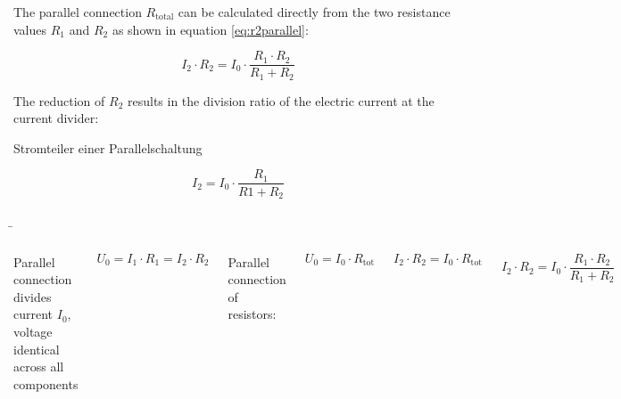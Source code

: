 \begin{frame}
{		The parallel connection $R_\mathrm{total}$ can be calculated directly from the two resistance values
		$R_1$ and $R_2$ as shown in equation \ref{eq:r2parallel}:
		
		\begin{equation*}
			I_2 \cdot R_2 = I_0 \cdot \frac{R_1 \cdot R_2}{R_1 + R_2}
		\end{equation*}
		
		The reduction of $R_2$ results in the division ratio of the electric current at the current divider:
		
		\begin{Key point}{Stromteiler einer Parallelschaltung}
			
			\begin{equation}
				I_2 = I_0 \cdot \frac{R_1}{R1 + R_2}
			\end{equation}
		\end{Key point}
		
		
	}
	
	
	\b{
		\begin{columns}
			
			Parallel connection divides current $I_0$,
			voltage identical across all components
			
			\begin{equation*}
				U_0 = I_1 \cdot R_1 = I_2 \cdot R_2
			\end{equation*}
			
			Parallel connection of resistors: 
			
			\begin{equation*}
				U_0 = I_0 \cdot R_\mathrm{tot}
			\end{equation*}
			\vspace*{-10pt}
			
			\begin{equation*}
				I_2 \cdot R_2 = I_0 \cdot R_\mathrm{tot}
			\end{equation*}
			
			\begin{equation*}
				I_2 \cdot R_2  = I_0 \cdot \frac{R_1 \cdot R_2}{R_1 + R_2}
			\end{equation*}
			

\end{columns}}
\end{frame}
